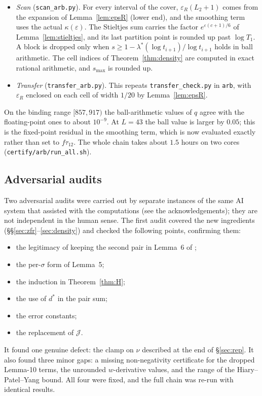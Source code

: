 \documentclass[11pt]{amsart}
\numberwithin{equation}{section}
\theoremstyle{definition}
\theoremstyle{remark}
\newcommand{\eps}{\varepsilon}
\newcommand{\code}[1]{\texttt{#1}}
\begin{document}
\begin{itemize}
\item \emph{Scan} (\code{scan\_arb.py}). For every interval of the cover, $\eps_R(L_2+1)$ comes from the expansion of Lemma~\ref{lem:epsR} (lower end), and the smoothing term uses the actual $\kappa(\eps)$.
  The Stieltjes sum carries the factor $e^{\eps(c+1)/6}$ of Lemma~\ref{lem:stieltjes}, and its last partition point is rounded up past $\log T_1$.
  A block is dropped only when $s \ge 1 - \lambda^*(\log t_{i+1})/\log t_{i+1}$ holds in ball arithmetic.
  The cell indices of Theorem~\ref{thm:density} are computed in exact rational arithmetic, and $s_{\max}$ is rounded up.
\item \emph{Transfer} (\code{transfer\_arb.py}). This repeats \code{transfer\_check.py} in \code{arb}, with $\eps_R$ enclosed on each cell of width $1/20$ by Lemma~\ref{lem:epsR}.
\end{itemize}
On the binding range $[857,917)$ the ball-arithmetic values of $q$ agree with the floating-point ones to about $10^{-9}$.
At $L = 43$ the ball value is larger by $0.05$; this is the fixed-point residual in the smoothing term, which is now evaluated exactly rather than set to $f\tau_{12}$.
The whole chain takes about $1.5$ hours on two cores (\code{certify/arb/run\_all.sh}).

\subsection{Adversarial audits}
Two adversarial audits were carried out by separate instances of the same AI system that assisted with the computations (see the acknowledgements); they are not independent in the human sense.
The first audit covered the new ingredients (\S\S\ref{sec:zfr}--\ref{sec:density}) and checked the following points, confirming them:
\begin{itemize}
\item the legitimacy of keeping the second pair in Lemma~6 of \cite{BTY};
\item the per-$\sigma$ form of Lemma~5;
\item the induction in Theorem~\ref{thm:H};
\item the use of $d^*$ in the pair sum;
\item the error constants;
\item the replacement of $\mathcal J$.
\end{itemize}
It found one genuine defect: the clamp on $\nu$ described at the end of \S\ref{sec:rep}.
It also found three minor gaps: a missing non-negativity certificate for the dropped Lemma-10 terms, the unrounded $w$-derivative values, and the range of the Hiary--Patel--Yang bound.
All four were fixed, and the full chain was re-run with identical results.
\end{document}
